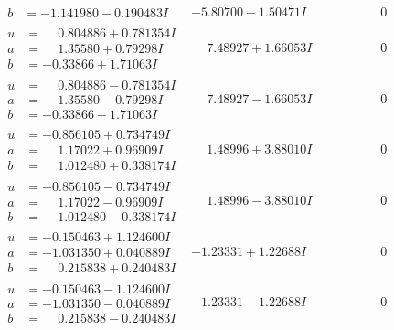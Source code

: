 \documentclass[1p]{elsarticle_modified}
\theoremstyle{definition}
\begin{document}
$$\begin{array}{c|c|c}
\begin{aligned}
b &= -1.141980 - 0.190483 I\end{aligned}
 & -5.80700 - 1.50471 I & \phantom{-0.000000 } 0 \\ \hline\begin{aligned}
u &= \phantom{-}0.804886 + 0.781354 I \\
a &= \phantom{-}1.35580 + 0.79298 I \\
b &= -0.33866 + 1.71063 I\end{aligned}
 & \phantom{-}7.48927 + 1.66053 I & \phantom{-0.000000 } 0 \\ \hline\begin{aligned}
u &= \phantom{-}0.804886 - 0.781354 I \\
a &= \phantom{-}1.35580 - 0.79298 I \\
b &= -0.33866 - 1.71063 I\end{aligned}
 & \phantom{-}7.48927 - 1.66053 I & \phantom{-0.000000 } 0 \\ \hline\begin{aligned}
u &= -0.856105 + 0.734749 I \\
a &= \phantom{-}1.17022 + 0.96909 I \\
b &= \phantom{-}1.012480 + 0.338174 I\end{aligned}
 & \phantom{-}1.48996 + 3.88010 I & \phantom{-0.000000 } 0 \\ \hline\begin{aligned}
u &= -0.856105 - 0.734749 I \\
a &= \phantom{-}1.17022 - 0.96909 I \\
b &= \phantom{-}1.012480 - 0.338174 I\end{aligned}
 & \phantom{-}1.48996 - 3.88010 I & \phantom{-0.000000 } 0 \\ \hline\begin{aligned}
u &= -0.150463 + 1.124600 I \\
a &= -1.031350 + 0.040889 I \\
b &= \phantom{-}0.215838 + 0.240483 I\end{aligned}
 & -1.23331 + 1.22688 I & \phantom{-0.000000 } 0 \\ \hline\begin{aligned}
u &= -0.150463 - 1.124600 I \\
a &= -1.031350 - 0.040889 I \\
b &= \phantom{-}0.215838 - 0.240483 I\end{aligned}
 & -1.23331 - 1.22688 I & \phantom{-0.000000 } 0 \\ \hline\begin{aligned}

\end{aligned}
\end{array}$$
\end{document}
